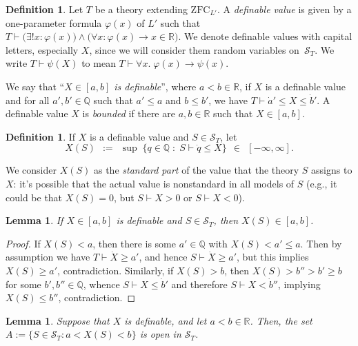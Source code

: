 \documentclass[12pt]{article}
\newcommand{\vp}{\varphi}
\newcommand{\RR}{\mathbb{R}}
\newcommand{\QQ}{\mathbb{Q}}
\newcommand{\zfc}{\mathrm{ZFC}}
\newcommand{\zfcl}{{\zfc_{\cL}}}
\newcommand{\cL}{L'}
\newcommand{\cS}{\mathcal{S}}
\newcommand{\inClosed}[1]{#1 \in [a, b]}
\theoremstyle{plain}
\newtheorem{lemma}[theorem]{Lemma}
\theoremstyle{definition}
\newtheorem{definition}[theorem]{Definition}
\theoremstyle{remark}
\begin{document}
\begin{definition}
Let $T$ be a theory extending $\zfcl$. 
A \emph{definable value}
is given by a one-parameter formula $\vp(x)$ of $\cL$ such that $T\vdash\big(\exists!x:\vp(x)\big)\wedge\big(\forall x:\vp(x)\to x\in\RR\big)$. 
We denote definable values with capital letters, especially $X$, since we will consider them random variables on~$\cS_T$.
We write $T\vdash\psi(X)$ to mean $T\vdash\forall x.\;\vp(x)\to\psi(x)$.

We say that ``\emph{$X\in[a,b]$ is definable}'', where $a<b\in\RR$, if $X$ is a definable value and for all $a',b'\in\QQ$ such that $a'\le a$ and $b\le b'$, we have $T\vdash\dot a'\le X\le \dot b'$.
A definable value $X$ is \emph{bounded} if there are $a,b\in\RR$ such that $\inClosed{X}$.
\end{definition}
\begin{definition}
If $X$ is a definable value and $S\in\cS_T$, let
\[X(S) \;\,:=\;\, \sup\;\{q\in\QQ \;:\; S\vdash \dot q \le X\} \;\,\in\;\, [-\infty,\infty].\]
\end{definition}
We consider $X(S)$ as the \emph{standard part} of the value that the theory $S$ assigns to $X$: it's possible that the actual value is nonstandard in all models of $S$ (e.g., it could be that $X(S) = 0$, but $S\vdash X>0$ or $S\vdash X<0$).
\begin{lemma}
If $X\in[a,b]$ is definable and $S\in\cS_T$, then $X(S)\in[a,b]$.
\end{lemma}
\begin{proof}
If $X(S) < a$, then there is some $a'\in\QQ$ with $X(S) < a' \le a$. 
Then by assumption we have $T\vdash\dot X\geq a'$, and hence $S\vdash\dot X\geq a'$, but this implies $X(S)\ge a'$, contradiction.
Similarly, if $X(S) > b$, then $X(S) > b'' > b' \ge b$ for some $b',b''\in\QQ$, whence $S\vdash X\le\dot b'$ and therefore $S\vdash X<\dot b''$, implying $X(S) \le b''$, contradiction.
\end{proof}
\begin{lemma}
Suppose that $X$ is definable, and let $a<b\in\RR$. Then, the set $A := \{S\in\cS_T : a< X(S)<b\}$ is open in $\cS_T$.
\end{lemma}
\end{document}
